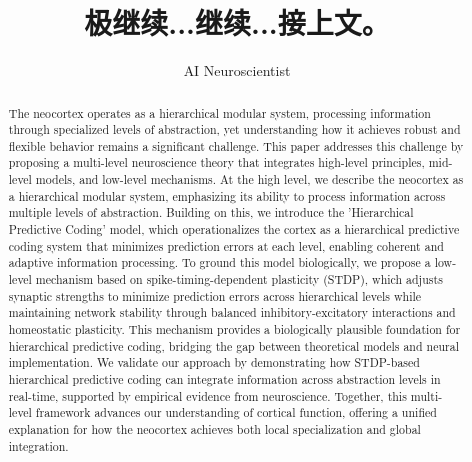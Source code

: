\documentclass{article}
\title{极继续...继续...接上文。}
\author{\normalsizeauthor AI Neuroscientist}
\date{}
\begin{document}
\maketitle

\begin{abstract}
The neocortex operates as a hierarchical modular system, processing information through specialized levels of abstraction, yet understanding how it achieves robust and flexible behavior remains a significant challenge. This paper addresses this challenge by proposing a multi-level neuroscience theory that integrates high-level principles, mid-level models, and low-level mechanisms. At the high level, we describe the neocortex as a hierarchical modular system, emphasizing its ability to process information across multiple levels of abstraction. Building on this, we introduce the 'Hierarchical Predictive Coding' model, which operationalizes the cortex as a hierarchical predictive coding system that minimizes prediction errors at each level, enabling coherent and adaptive information processing. To ground this model biologically, we propose a low-level mechanism based on spike-timing-dependent plasticity (STDP), which adjusts synaptic strengths to minimize prediction errors across hierarchical levels while maintaining network stability through balanced inhibitory-excitatory interactions and homeostatic plasticity. This mechanism provides a biologically plausible foundation for hierarchical predictive coding, bridging the gap between theoretical models and neural implementation. We validate our approach by demonstrating how STDP-based hierarchical predictive coding can integrate information across abstraction levels in real-time, supported by empirical evidence from neuroscience. Together, this multi-level framework advances our understanding of cortical function, offering a unified explanation for how the neocortex achieves both local specialization and global integration.
\end{abstract}
\end{document}

